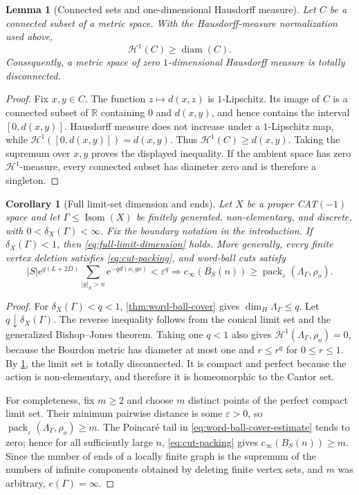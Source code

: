 \documentclass[11pt]{article}
\newtheorem{corollary}[corollary]{Corollary}
\newtheorem{lemma}[lemma]{Lemma}
\theoremstyle{definition}
\newcommand{\Isom}{\operatorname{Isom}}
\newcommand{\diam}{\operatorname{diam}}
\newcommand{\pack}{\operatorname{pack}}
\newcommand{\e}{\mathrm e}
\begin{document}
\begin{lemma}[Connected sets and one-dimensional Hausdorff measure]
\label{lem:connected-H1}
Let $C$ be a connected subset of a metric space.  With the Hausdorff-measure normalization
used above,
\[
 \mathcal H^1(C)\ge \diam(C).
\]
Consequently, a metric space of zero $1$-dimensional Hausdorff measure is totally
disconnected.
\end{lemma}

\begin{proof}
Fix $x,y\in C$.  The function $z\mapsto d(x,z)$ is $1$-Lipschitz.  Its image of $C$ is a
connected subset of $\mathbb R$ containing $0$ and $d(x,y)$, and hence contains the interval
$[0,d(x,y)]$.  Hausdorff measure does not increase under a $1$-Lipschitz map, while
$\mathcal H^1([0,d(x,y)])=d(x,y)$.  Thus
$\mathcal H^1(C)\ge d(x,y)$.  Taking the supremum over $x,y$ proves the displayed
inequality.  If the ambient space has zero $\mathcal H^1$-measure, every connected subset has
diameter zero and is therefore a singleton.
\end{proof}

\begin{corollary}[Full limit-set dimension and ends]
\label{cor:word-ball-dimension-ends}
Let $X$ be a proper CAT$(-1)$ space and let $\Gamma\le\Isom(X)$ be finitely generated,
non-elementary, and discrete, with $0<\delta_X(\Gamma)<\infty$.  Fix the boundary
notation in the introduction.  If $\delta_X(\Gamma)<1$, then
\eqref{eq:full-limit-dimension} holds.  More generally, every
finite vertex deletion satisfies \eqref{eq:cut-packing}, and word-ball cuts satisfy
\[
 |S|\e^{q(L+2D)}\sum_{|g|_S>n}\e^{-q d(o,go)}<\varepsilon^q
 \Longrightarrow
 c_\infty(B_S(n))\ge\pack_\varepsilon(\Lambda_\Gamma,\rho_o).
\]
\end{corollary}

\begin{proof}
For $\delta_X(\Gamma)<q<1$, \cref{thm:word-ball-cover} gives
$\dim_H\Lambda_\Gamma\le q$.  Let $q\downarrow\delta_X(\Gamma)$. The reverse inequality
follows from the conical limit set and the generalized Bishop--Jones theorem.  Taking one
$q<1$ also gives $\mathcal H^1(\Lambda_\Gamma,\rho_o)=0$, because the Bourdon metric has
diameter at most one and $r\le r^q$ for $0\le r\le1$.  By
\cref{lem:connected-H1}, the limit set is totally disconnected.  It is compact and perfect
because the action is non-elementary, and therefore it is homeomorphic to the Cantor set.

For completeness, fix $m\ge2$ and choose $m$ distinct points of the perfect compact limit
set.  Their minimum pairwise distance is some $\varepsilon>0$, so
$\pack_\varepsilon(\Lambda_\Gamma,\rho_o)\ge m$.  The Poincar\'e tail in
\eqref{eq:word-ball-cover-estimate} tends to zero; hence for all sufficiently large $n$,
\eqref{eq:cut-packing} gives $c_\infty(B_S(n))\ge m$.  Since the number of ends of a locally
finite graph is the supremum of the numbers of infinite components obtained by deleting
finite vertex sets, and $m$ was arbitrary, $e(\Gamma)=\infty$.
\end{proof}
\end{document}
